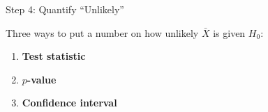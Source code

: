 \documentclass[9pt,english,aspectratio=169]{beamer}
\begin{document}

\begin{frame}[label=quantify-unlikely]{Step 4: Quantify ``Unlikely''}

  \vspace{0.6em}
  Three ways to put a number on how unlikely $\bar{X}$ is given $H_0$:

  \vspace{0.9em}
  \begin{enumerate}
    \item \textbf{Test statistic} 
      \vspace{0.5em}
    \item \textbf{$p$-value} 
      \vspace{0.5em}
    \item \textbf{Confidence interval} 
      \quad \hyperlink{ci-intervals}{}
  \end{enumerate}

\end{frame}
\end{document}
